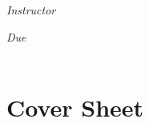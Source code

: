 \documentclass[12pt, oneside]{book}
\begin{document}
\begin{titlepage}
\begin{center}
\begin{large}
            \vspace*{1\baselineskip}

            \textit{Instructor} \\[1ex] %
            \professor

            \vspace*{1\baselineskip}

            \textit{Due}\\[1ex]
            {\scshape  \finaldate} \\[0.3\baselineskip] %

            \thispagestyle{empty}

        \end{large}
    \end{center}
\end{titlepage}


\section*{Cover Sheet}
\end{document}
